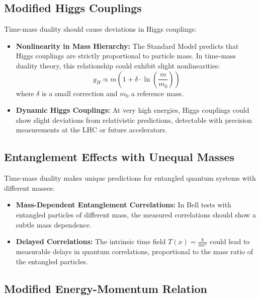 \documentclass[a4paper,12pt]{article}
\newcommand{\Tfield}{T(x)} %
\begin{document}
	\subsection{Modified Higgs Couplings}
	
	Time-mass duality should cause deviations in Higgs couplings:
	
	\begin{itemize}
		\item \textbf{Nonlinearity in Mass Hierarchy:} The Standard Model predicts that Higgs couplings are strictly proportional to particle mass. In time-mass duality theory, this relationship could exhibit slight nonlinearities:
		\begin{equation}
			g_H \propto m \left(1 + \delta \cdot \ln\left(\frac{m}{m_0}\right)\right)
		\end{equation}
		where $\delta$ is a small correction and $m_0$ a reference mass.
		
		\item \textbf{Dynamic Higgs Couplings:} At very high energies, Higgs couplings could show slight deviations from relativistic predictions, detectable with precision measurements at the LHC or future accelerators.
	\end{itemize}
	
	\subsection{Entanglement Effects with Unequal Masses}
	
	Time-mass duality makes unique predictions for entangled quantum systems with different masses:
	
	\begin{itemize}
		\item \textbf{Mass-Dependent Entanglement Correlations:} In Bell tests with entangled particles of different mass, the measured correlations should show a subtle mass dependence.
		
		\item \textbf{Delayed Correlations:} The intrinsic time field $\Tfield = \frac{\hbar}{mc^2}$ could lead to measurable delays in quantum correlations, proportional to the mass ratio of the entangled particles.
	\end{itemize}
	
	\subsection{Modified Energy-Momentum Relation}
	
\end{document}
